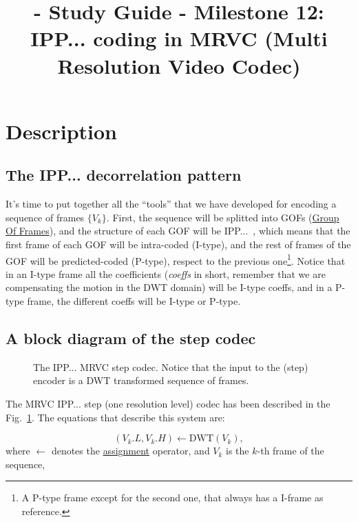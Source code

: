 
\title{\SM{} - Study Guide - Milestone 12: IPP... coding in MRVC (Multi Resolution Video Codec)}

\maketitle

\tableofcontents

\section{Description}

\subsection{The IPP... decorrelation pattern}
It's time to put together all the ``tools'' that we have developed for
encoding a sequence of frames $\{V_k\}$. First, the sequence will be
splitted into GOFs
(\href{https://en.wikipedia.org/wiki/Group_of_pictures}{Group Of
  Frames}), and the structure of each GOF will be
IPP...~\cite{le1991mpeg}, which means that the first frame of each GOF
will be intra-coded (I-type), and the rest of frames of the GOF will
be predicted-coded (P-type), respect to the previous one\footnote{A
  P-type frame except for the second one, that always has a I-frame as
  reference.}. Notice that in an I-type frame all the coefficients
(\emph{coeffs} in short, remember that we are compensating the motion
in the DWT domain) will be I-type coeffs, and in a P-type frame, the
different coeffs will be I-type or P-type.

\subsection{A block diagram of the step codec}

\begin{figure}
  \centering
  \caption{The IPP... MRVC step codec. Notice that the input to the
    (step) encoder is a DWT transformed sequence of frames.}
  \label{fig:codec}
\end{figure}

The MRVC IPP... step (one resolution level) codec has been described in the
Fig.~\ref{fig:codec}. The equations that describe this system are:

\begin{equation}
  (V_k.L, V_k.H) \leftarrow \text{DWT}(V_k),
  \tag{a}
\end{equation}
where $\leftarrow$ denotes the
\href{https://en.wikipedia.org/wiki/Assignment_(computer_science)}{assignment}
operator, and $V_k$ is the $k$-th frame of the sequence,

